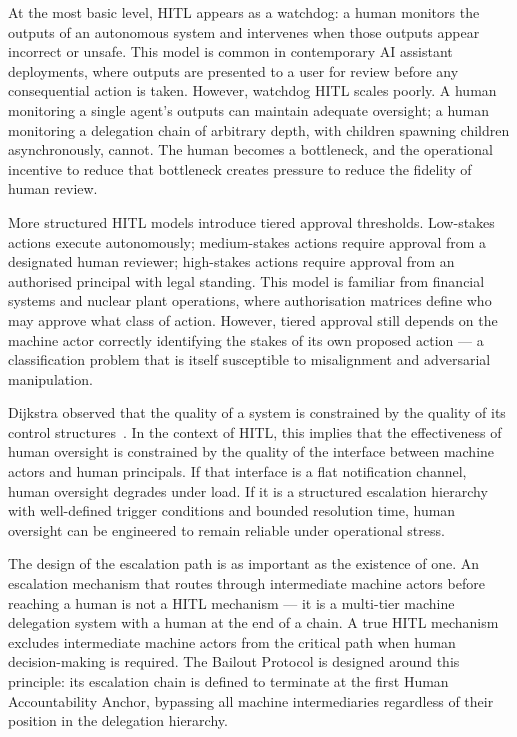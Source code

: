 At the most basic level, HITL appears as a watchdog: a human monitors the outputs of an autonomous system and intervenes when those outputs appear incorrect or unsafe. This model is common in contemporary AI assistant deployments, where outputs are presented to a user for review before any consequential action is taken. However, watchdog HITL scales poorly. A human monitoring a single agent's outputs can maintain adequate oversight; a human monitoring a delegation chain of arbitrary depth, with children spawning children asynchronously, cannot. The human becomes a bottleneck, and the operational incentive to reduce that bottleneck creates pressure to reduce the fidelity of human review.

More structured HITL models introduce tiered approval thresholds. Low-stakes actions execute autonomously; medium-stakes actions require approval from a designated human reviewer; high-stakes actions require approval from an authorised principal with legal standing. This model is familiar from financial systems and nuclear plant operations, where authorisation matrices define who may approve what class of action. However, tiered approval still depends on the machine actor correctly identifying the stakes of its own proposed action — a classification problem that is itself susceptible to misalignment and adversarial manipulation.

Dijkstra observed that the quality of a system is constrained by the quality of its control structures~\cite{dijkstra1982}. In the context of HITL, this implies that the effectiveness of human oversight is constrained by the quality of the interface between machine actors and human principals. If that interface is a flat notification channel, human oversight degrades under load. If it is a structured escalation hierarchy with well-defined trigger conditions and bounded resolution time, human oversight can be engineered to remain reliable under operational stress.

The design of the escalation path is as important as the existence of one. An escalation mechanism that routes through intermediate machine actors before reaching a human is not a HITL mechanism — it is a multi-tier machine delegation system with a human at the end of a chain. A true HITL mechanism excludes intermediate machine actors from the critical path when human decision-making is required. The Bailout Protocol is designed around this principle: its escalation chain is defined to terminate at the first Human Accountability Anchor, bypassing all machine intermediaries regardless of their position in the delegation hierarchy.

